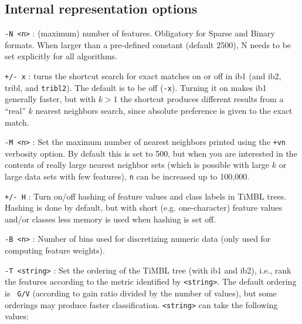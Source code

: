 \documentclass{report}
\begin{document}
\subsection{Internal representation options}

\begin{description}

\item {\tt -N <n>} : (maximum) number of features. Obligatory for
  Sparse and Binary formats. When larger than a pre-defined constant
  (default 2500), N needs to be set explicitly for all algorithms.

\item {\tt +/- x} : turns the shortcut search for exact matches on or
  off in {\sc ib1} (and {\sc ib2}, {\sc tribl}, and {\tt tribl2}). The
  default is to be off ({\tt -x}). Turning it on makes {\sc ib1}
  generally faster, but with $k>1$ the shortcut produces different
  results from a ``real'' $k$ nearest neighbors search, since absolute
  preference is given to the exact match.

\item {\tt -M <n>} : Set the maximum number of nearest neighbors
  printed using the {\tt +vn} verbosity option. By default this is set
  to 500, but when you are interested in the contents of really large
  nearest neighbor sets (which is possible with large $k$ or large
  data sets with few features), {\tt n} can be increased up to
  100,000.

\item {\tt +/- H} : Turn on/off hashing of feature values and class
  labels in TiMBL trees. Hashing is done by default, but with short
  (e.g. one-character) feature values and/or classes less memory is
  used when hashing is set off.

\item {\tt -B <n>} : Number of bins used for discretizing numeric data
  (only used for computing feature weights).

\item {\tt -T <string>} : Set the ordering of the TiMBL tree (with
  {\sc ib1} and {\sc ib2}), i.e., rank the features according to the
  metric identified by {\tt <string>}. The default ordering is {\tt
    G/V} (according to gain ratio divided by the number of values),
  but some orderings may produce faster classification. {\tt <string>}
  can take the following values:


\end{description}
\end{document}
